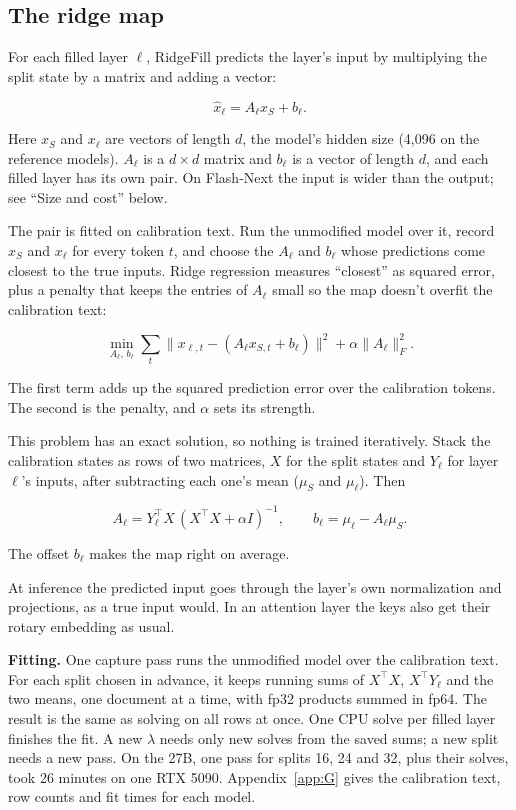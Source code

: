\documentclass[11pt]{article}
\begin{document}
\subsection{The ridge map}\label{sec:2.2}
For each filled layer $\ell$, RidgeFill predicts the layer's input by multiplying the split state by a matrix and adding a vector:

\[\hat{x}_\ell = A_\ell x_S + b_\ell .\]

Here $x_S$ and $x_\ell$ are vectors of length $d$, the model's hidden size (4,096 on the reference models). $A_\ell$ is a $d \times d$ matrix and $b_\ell$ is a vector of length $d$, and each filled layer has its own pair. On Flash-Next the input is wider than the output; see ``Size and cost'' below.

The pair is fitted on calibration text. Run the unmodified model over it, record $x_S$ and $x_\ell$ for every token $t$, and choose the $A_\ell$ and $b_\ell$ whose predictions come closest to the true inputs. Ridge regression measures ``closest'' as squared error, plus a penalty that keeps the entries of $A_\ell$ small so the map doesn't overfit the calibration text:

\[\min_{A_\ell,\, b_\ell} \sum_t \lVert x_{\ell,t} - (A_\ell x_{S,t} + b_\ell) \rVert^2 + \alpha \lVert A_\ell \rVert_F^2 .\]

The first term adds up the squared prediction error over the calibration tokens. The second is the penalty, and $\alpha$ sets its strength.

This problem has an exact solution, so nothing is trained iteratively. Stack the calibration states as rows of two matrices, $X$ for the split states and $Y_\ell$ for layer $\ell$'s inputs, after subtracting each one's mean ($\mu_S$ and $\mu_\ell$). Then

\[A_\ell = Y_\ell^\top X \,(X^\top X + \alpha I)^{-1}, \qquad b_\ell = \mu_\ell - A_\ell \mu_S .\]

The offset $b_\ell$ makes the map right on average.

At inference the predicted input goes through the layer's own normalization and projections, as a true input would. In an attention layer the keys also get their rotary embedding as usual.

\textbf{Fitting.} One capture pass runs the unmodified model over the calibration text. For each split chosen in advance, it keeps running sums of $X^\top X$, $X^\top Y_\ell$ and the two means, one document at a time, with fp32 products summed in fp64. The result is the same as solving on all rows at once. One CPU solve per filled layer finishes the fit. A new $\lambda$ needs only new solves from the saved sums; a new split needs a new pass. On the 27B, one pass for splits 16, 24 and 32, plus their solves, took 26 minutes on one RTX 5090. Appendix~\ref{app:G} gives the calibration text, row counts and fit times for each model.
\end{document}
